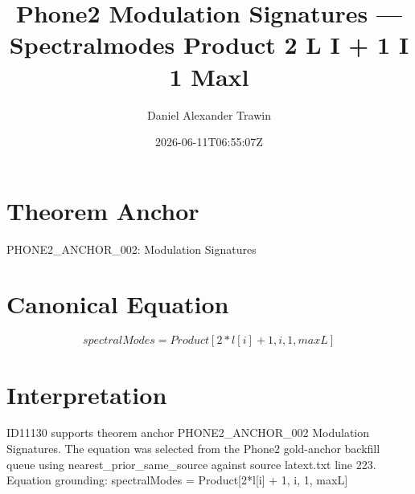 \documentclass[11pt]{article}
\title{Phone2 Modulation Signatures — Spectralmodes Product 2 L I + 1 I 1 Maxl}
\author{Daniel Alexander Trawin}
\date{2026-06-11T06:55:07Z}
\begin{document}
\maketitle
\section*{Theorem Anchor}
PHONE2_ANCHOR_002: Modulation Signatures
\section*{Canonical Equation}
\[
spectralModes = Product[2*l[i] + 1, {i, 1, maxL}]
\]
\section*{Interpretation}
ID11130 supports theorem anchor PHONE2_ANCHOR_002 Modulation Signatures. The equation was selected from the Phone2 gold-anchor backfill queue using nearest_prior_same_source against source latext.txt line 223. Equation grounding: spectralModes = Product[2*l[i] + 1, {i, 1, maxL}]
\end{document}
